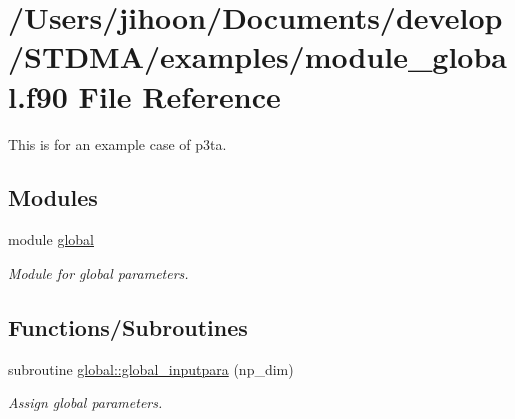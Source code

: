 \hypertarget{module__global_8f90}{}\section{/\+Users/jihoon/\+Documents/develop/\+S\+T\+D\+M\+A/examples/module\+\_\+global.f90 File Reference}
\label{module__global_8f90}


This is for an example case of p3ta.  


\subsection*{Modules}
\begin{DoxyCompactItemize}
\item 
module \mbox{\hyperlink{namespaceglobal}{global}}
\begin{DoxyCompactList}\small\item\em Module for global parameters. \end{DoxyCompactList}\end{DoxyCompactItemize}
\subsection*{Functions/\+Subroutines}
\begin{DoxyCompactItemize}
\item 
subroutine \mbox{\hyperlink{namespaceglobal_a930b565da2644b675f35b91735e11ce3}{global\+::global\+\_\+inputpara}} (np\+\_\+dim)
\begin{DoxyCompactList}\small\item\em Assign global parameters. \end{DoxyCompactList}\end{DoxyCompactItemize}

